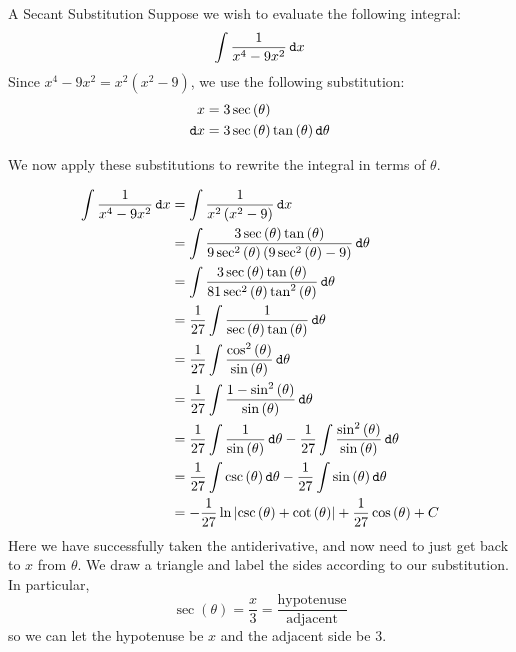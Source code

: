 \begin{example}{A Secant Substitution}\label{secsub}
Suppose we wish to evaluate the following integral: $$\int \frac{1}{x^4-9x^2}\mathop{}\!\mathtt{d} x $$  Since $x^4-9x^2=x^2\left(x^2-9\right)$, we use the following substitution: 
\begin{align*}
x&=3\sec\left(\theta\right) \\
\mathop{}\!\mathtt{d} x &= 3 \sec\left(\theta\right)\tan\left(\theta\right)\mathop{}\!\mathtt{d} \theta 
\end{align*}

We now apply these substitutions to rewrite the integral in terms of $\theta$.

\begin{align*}
\int \frac{1}{x^4-9x^2}\dif x &=\int \frac{1}{x^2\left(x^2-9\right)}\dif x  \\
&=\int \frac{3 \sec\left(\theta\right)\tan\left(\theta\right)}{9\sec^2\left(\theta\right)\left(9\sec^2\left(\theta\right)-9\right)}\dif \theta \\
&=\int \frac{3 \sec\left(\theta\right)\tan\left(\theta\right)}{81\sec^2\left(\theta\right)\tan^2\left(\theta\right)}\dif \theta \\
&=\frac{1}{27}\int \frac{1}{\sec\left(\theta\right)\tan\left(\theta\right)}\dif \theta \\
&=\frac{1}{27}\int\frac{\cos^2\left(\theta\right)}{\sin\left(\theta\right)} \dif \theta \\
&=\frac{1}{27}\int\frac{1-\sin^2\left(\theta\right)}{\sin\left(\theta\right)} \dif \theta \\
&=\frac{1}{27}\int\frac{1}{\sin\left(\theta\right)} \dif \theta-\frac{1}{27}\int \frac{\sin^2\left(\theta\right)}{\sin\left(\theta\right)}\dif \theta \\
&=\frac{1}{27}\int \csc\left(\theta\right) \dif \theta -\frac{1}{27}\int \sin\left(\theta\right) \dif \theta \\
&=-\frac{1}{27}\ln\left|\csc\left(\theta\right)+\cot\left(\theta\right)\right|+\frac{1}{27}\cos\left(\theta\right)+C
\end{align*}
Here we have successfully taken the antiderivative, and now need to just get back to $x$ from $\theta$.  We draw a triangle and label the sides according to our substitution.  In particular, $$\sec\left(\theta\right)=\frac{x}{3}=\frac{\text{hypotenuse}}{\text{adjacent}}$$ so we can let the hypotenuse be $x$ and the adjacent side be 3.
\begin{center}

\end{center}
\end{example}
